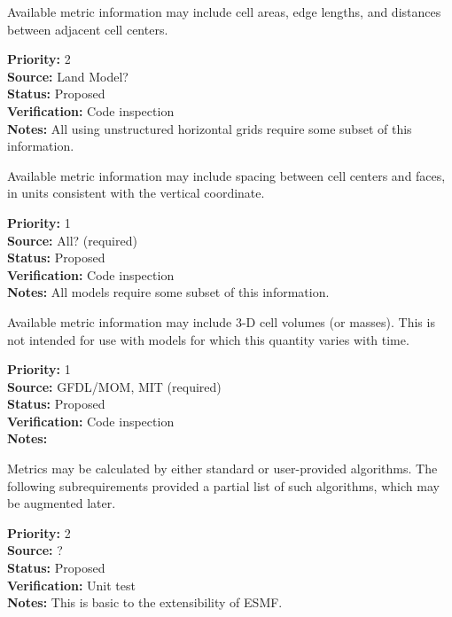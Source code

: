 Available metric information may include cell areas, edge lengths, and distances between
adjacent cell centers.
\begin{reqlist}
{\bf Priority:} 2 \\
{\bf Source:} Land Model? \\
{\bf Status:} Proposed \\
{\bf Verification:} Code inspection \\
{\bf Notes:} All using unstructured horizontal grids require some subset of this
information.
\end{reqlist}

Available metric information may include spacing between cell centers and faces, in
units consistent with the vertical coordinate.
\begin{reqlist}
{\bf Priority:} 1 \\
{\bf Source:} All? (required) \\
{\bf Status:} Proposed \\
{\bf Verification:} Code inspection \\
{\bf Notes:} All models require some subset of this information.
\end{reqlist}

Available metric information may include 3-D cell volumes (or masses).  This is not
intended for use with models for which this quantity varies with time.
\begin{reqlist}
{\bf Priority:} 1 \\
{\bf Source:} GFDL/MOM, MIT (required) \\
{\bf Status:} Proposed \\
{\bf Verification:} Code inspection \\
{\bf Notes:} 
\end{reqlist}

Metrics may be calculated by either standard or user-provided algorithms.
The following subrequirements provided a partial list of such algorithms,
which may be augmented later.
\begin{reqlist}
{\bf Priority:} 2 \\
{\bf Source:} ? \\
{\bf Status:} Proposed \\
{\bf Verification:} Unit test \\
{\bf Notes:} This is basic to the extensibility of ESMF. 
\end{reqlist}

